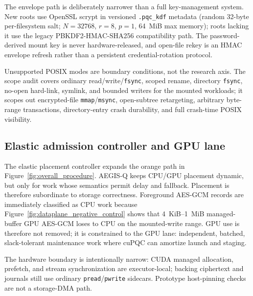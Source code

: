 The envelope path is deliberately narrower than a full key-management system.  New roots use OpenSSL scrypt in versioned \texttt{.pqc\_kdf} metadata (random 32-byte per-filesystem salt; \(N=32768\), \(r=8\), \(p=1\), 64~MiB max memory); roots lacking it use the legacy PBKDF2-HMAC-SHA256 compatibility path.  The password-derived mount key is never hardware-released, and open-file rekey is an HMAC envelope refresh rather than a persistent credential-rotation protocol.

Unsupported POSIX modes are boundary conditions, not the research axis.  The scope audit covers ordinary read/write/\texttt{fsync}, scoped rename, directory \texttt{fsync}, no-open hard-link, symlink, and bounded writers for the mounted workloads; it scopes out encrypted-file \texttt{mmap}/\texttt{msync}, open-subtree retargeting, arbitrary byte-range transactions, directory-entry crash durability, and full crash-time POSIX visibility.

\subsection{Elastic admission controller and GPU lane}
\label{sec:design_uma}

The elastic placement controller expands the orange path in Figure~\ref{fig:overall_procedure}.  AEGIS-Q keeps CPU/GPU placement dynamic, but only for work whose semantics permit delay and fallback.  Placement is therefore subordinate to storage correctness.  Foreground AES-GCM records are immediately classified as CPU work because Figure~\ref{fig:dataplane_negative_control} shows that 4~KiB--1~MiB managed-buffer GPU AES-GCM loses to CPU on the mounted-write range.  GPU use is therefore not removed; it is constrained to the GPU lane: independent, batched, slack-tolerant maintenance work where cuPQC can amortize launch and staging.

The hardware boundary is intentionally narrow: CUDA managed allocation, prefetch, and stream synchronization are executor-local; backing ciphertext and journals still use ordinary \texttt{pread}/\texttt{pwrite} sidecars.  Prototype host-pinning checks are not a storage-DMA path.

